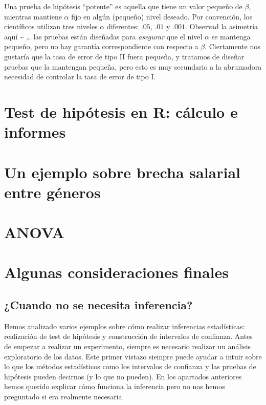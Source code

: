 \documentclass[
]{book}
\begin{document}
Una prueba de hipótesis ``potente'' es aquella que tiene un valor pequeño de \(\beta\), mientras mantiene \(\alpha\) fijo en algún (pequeño) nivel deseado. Por convención, los científicos utilizan tres niveles \(\alpha\) diferentes: \(.05\), \(.01\) y \(.001\). Observad la asimetría aquí \textasciitilde{} \ldots{} las pruebas están diseñadas para \emph{asegurar} que el nivel \(\alpha\) se mantenga pequeño, pero no hay garantía correspondiente con respecto a \(\beta\). Ciertamente nos gustaría que la tasa de error de tipo II fuera pequeña, y tratamos de diseñar pruebas que la mantengan pequeña, pero esto es muy secundario a la abrumadora necesidad de controlar la tasa de error de tipo I.

\hypertarget{test-de-hipuxf3tesis-en-r-cuxe1lculo-e-informes}{%
\section{Test de hipótesis en R: cálculo e informes}\label{test-de-hipuxf3tesis-en-r-cuxe1lculo-e-informes}}

\hypertarget{un-ejemplo-sobre-brecha-salarial-entre-guxe9neros}{%
\section{Un ejemplo sobre brecha salarial entre géneros}\label{un-ejemplo-sobre-brecha-salarial-entre-guxe9neros}}

\hypertarget{anova}{%
\section{ANOVA}\label{anova}}

\hypertarget{algunas-consideraciones-finales}{%
\section{Algunas consideraciones finales}\label{algunas-consideraciones-finales}}

\hypertarget{cuando-no-se-necesita-inferencia}{%
\subsection{¿Cuando no se necesita inferencia?}\label{cuando-no-se-necesita-inferencia}}

Hemos analizado varios ejemplos sobre cómo realizar inferencias estadísticas: realización de test de hipótesis y construcción de intervalos de confianza. Antes de empezar a realizar un experimento, siempre es necesario realizar un análisis exploratorio de los datos. Este primer vistazo siempre puede ayudar a intuir sobre lo que los métodos estadísticos como los intervalos de confianza y las pruebas de hipótesis pueden decirnos (y lo que no pueden). En los apartados anteriores hemos querido explicar cómo funciona la inferencia pero no nos hemos preguntado si era realmente necesaria.
\end{document}
